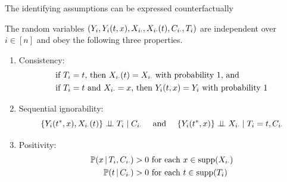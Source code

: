 \documentclass[aspectratio=169]{beamer}
\theoremstyle{remark}
\begin{document}
\begin{frame}{The identifying assumptions can be expressed counterfactually}

    The random variables $(Y_i, Y_i(t, x), X_{i \cdot}, X_{i \cdot}(t), C_{i \cdot}, T_i)$ are independent over $i \in [n]$ and obey the following three properties.
    \begin{enumerate}
        \item Consistency: \vspace{-3mm}
              \begin{equation*} \begin{aligned}
                       & \text{if $T_i = t$, then $\X_{i \cdot}(t) = \X_{i \cdot}$ with probability 1, and}    \\
                       & \text{if $T_i = t$ and $\X_{i \cdot} = x$, then $Y_i(t, x) = Y_i$ with probability 1}
                      \vspace{-2mm}
                  \end{aligned} \end{equation*}
        \item Sequential ignorability:
              \begin{equation*}
                  \{Y_i(t^*, x), X_{i \cdot}(t)\} \perp \!\!\! \perp T_i \mid C_{i \cdot}
                  ~~~\text{ and }~~~
                  \{Y_i(t^*, x)\} \perp \!\!\! \perp X_{i \cdot}  \mid T_i = t, C_{i \cdot}
              \end{equation*}
        \item Positivity:
              \begin{equation*}
                  \begin{aligned}
                      \P[T_i, \C_{i \cdot}]{x} & > 0 \text{ for each }  x \in \supp(\X_{i \cdot}) \\
                      \P[\C_{i \cdot}]{t}      & > 0 \text{ for each }  t \in \supp(T_i)
                  \end{aligned}
              \end{equation*}
    \end{enumerate}

\end{frame}
\end{document}
